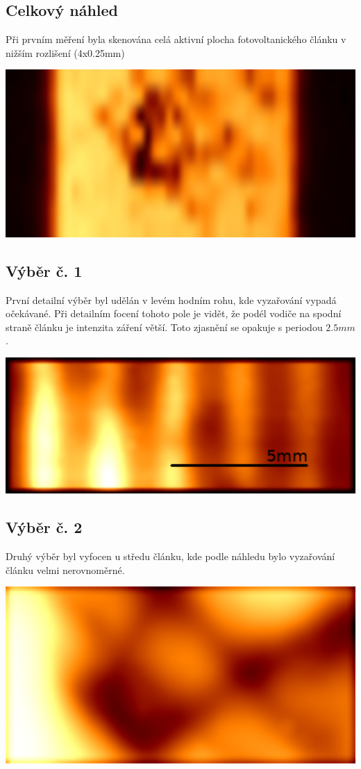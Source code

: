 \documentclass[12pt,a4paper,leqno]{report}
\begin{document}
\subsection{Celkový náhled}
\par Při prvním měření byla skenována celá aktivní plocha fotovoltanického článku v nižším rozlišení (4x0.25mm)

\begin{center}
\includegraphics[width=15cm]{3e}
\end{center}

\subsection{Výběr č. 1}
První detailní výběr byl udělán v levém hodním rohu, kde vyzařování vypadá očekávané. Při detailním focení tohoto pole je vidět, že podél vodiče na spodní straně článku je intenzita záření větší. Toto zjasnění se opakuje s periodou $2.5 mm$.  

\begin{center}
\includegraphics[width=15cm]{1}
\end{center}

\subsection{Výběr č. 2}
Druhý výběr byl vyfocen u středu článku, kde podle náhledu bylo vyzařování článku velmi nerovnoměrné.

\begin{center}
\includegraphics[width=15cm]{2}
\end{center}
\end{document}
